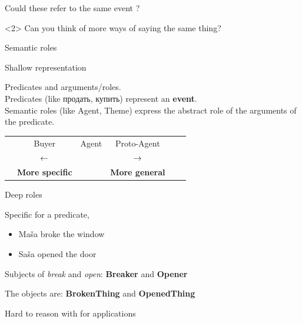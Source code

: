 \documentclass[10pt, compress]{beamer}
\begin{document}
\begin{frame}{}
\begin{center}
\begin{columns}
\begin{column}{0.5\textwidth}
\end{column}
\end{columns}

Could these refer to the same event ? 

\begin{onlyenv}<2>
Can you think of more ways of saying the same thing?
\end{onlyenv}

\end{center}


\end{frame}

\begin{frame}[standout]
  Semantic roles
\end{frame}


\begin{frame}{Shallow representation}

Predicates and arguments/roles. \\

Predicates (like продать, купить) represent an \textbf{event}. \\

Semantic roles (like Agent, Theme) express the abstract role of the arguments of the predicate. \\


\begin{center}
\begin{tabular}{cccccc}
              & {\Large Buyer}        &  {\Large Agent} & {\Large Proto-Agent}      &   \\
              & $ {\Large \leftarrow}$ &                 & $ {\Large \rightarrow} $  &  \\
              & \textbf{More specific} &                  &  \textbf{More general}   &
  
\end{tabular}
\end{center}

\end{frame}

\begin{frame}{Deep roles}

Specific for a predicate,

\begin{itemize}
  \item Maša broke the window 
  \item Saša opened the door
\end{itemize}

Subjects of \emph{break} and \emph{open}: {\bf Breaker} and {\bf Opener}

The objects are: {\bf BrokenThing} and {\bf OpenedThing}

Hard to reason with for applications

\end{frame}
\end{document}
